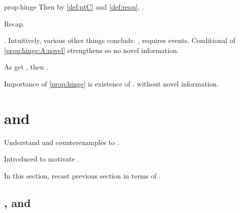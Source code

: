 \begin{note}
\begin{argument}{prop:hinge}
    Then by \autoref{def:ptC} and \autoref{def:requ}, \requ{}.
  \end{argument}

  Recap.

  \tCV{}.
  Intuitively, various other things conclude.
  \tRep{}, requires events.
  Conditional of \autoref{prop:hinge:A:novel} strengthens so no novel information.

  As get \fc{}, then \requ{}.

  Importance of \autoref{prop:hinge} is existence of \requ{}.
  \tCV{} without novel information.
\end{note}



\section{ and \issueConstraint{}}
\label{sec:tpyically-concluding}

\begin{note}
  Understand \requ{} and counterexamples to \issueConstraint{}.

  Introduced \tCV{} to motivate \requ{}.

  In this section, recast previous section in terms of \tCV{}.
\end{note}



\subsection{, \qWhyV{} and \issueConstraint{}}
\label{sec:tccon2-qwhyv-}

